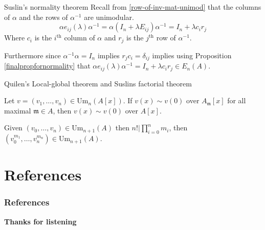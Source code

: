 \documentclass{beamer}
\begin{document}
\begin{frame}[allowframebreaks]{Suslin's normality theorem}
		Recall from \ref{row-of-inv-mat-unimod} that the columns of $\alpha$ and the rows of $\alpha^{-1}$ are unimodular.
		\[ \alpha e_{ij} (\lambda ) \alpha^{-1}= \alpha(I_n+\lambda E_{ij}) \alpha^{-1} = I_n +\lambda c_i r_j\]
		Where $c_i$ is the $i^\mathrm{th}$ column of $\alpha$ and $r_j$ is the $j^{\mathrm{th}}$ row of $\alpha^{-1}$.
		
		Furthermore since $\alpha^{-1}\alpha =I_n $ implies $r_jc_i=\delta_{ij} $ implies using Proposition \ref{finalpropfornormality} that $\alpha e_{ij}(\lambda) \alpha^{-1} = I_n + \lambda c_i r_j \in E_n(A)$.
\end{frame}


\begin{frame}{Quilen's Local-global theorem and Suslins factorial theorem}
\begin{theorem}\label{localglobalprinciple}
	Let $v = (v_1, \dots, v_n) \in \mathrm{Um}_n(A[x])$. If $v(x) \sim v(0)$ over $A_{\mathfrak{m}}[x]$ for all maximal $\mathfrak{m} \in A$, then $v(x) \sim v(0)$ over $A[x]$.
\end{theorem}	
	\begin{theorem}\label{suslinfactorial}
		Given $(v_0,\dots,v_n) \in \mathrm{Um}_{n+1}(A)$ then $n! | \prod_{i=0}^n m_i$, then $(v_0^{m_1}, \dots, v_n^{m_n}) \in \mathrm{Um}_{n+1}(A).$ 
	\end{theorem}
\end{frame}
\nocite{lam1999lectures}
\nocite{lam2001first}
\nocite{lam2010serre}
\nocite{lang02}
\nocite{matsumura_1987}
\nocite{hairyball}
\nocite{rosenberg1995algebraic}
\nocite{suslin1977}
\nocite{suslin1982}
\nocite{weibel2013k}
\section{References}
\begin{frame}[allowframebreaks]
        \frametitle{References}
        
        
    \tiny{}
\end{frame}
\begin{frame}
    \textbf{\Huge{Thanks for listening}}
\end{frame}
\end{document}
